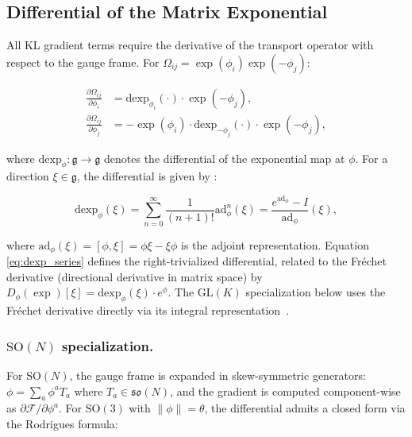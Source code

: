 \documentclass[twoside,11pt]{article}
\begin{document}
\subsection{Differential of the Matrix Exponential}

All KL gradient terms require the derivative of the transport operator with respect to the gauge frame. For $\Omega_{ij} = \exp(\phi_i)\exp(-\phi_j)$:

\begin{align}
\frac{\partial \Omega_{ij}}{\partial \phi_i} &= \mathrm{dexp}_{\phi_i}(\cdot) \cdot \exp(-\phi_j), \label{eq:dOmega_dphi_i} \\
\frac{\partial \Omega_{ij}}{\partial \phi_j} &= -\exp(\phi_i) \cdot \mathrm{dexp}_{-\phi_j}(\cdot) \cdot \exp(-\phi_j), \label{eq:dOmega_dphi_j}
\end{align}

where $\mathrm{dexp}_\phi: \mathfrak{g} \to \mathfrak{g}$ denotes the differential of the exponential map at $\phi$. For a direction $\xi \in \mathfrak{g}$, the differential is given by \citep{Gallier2020,Hall2015}:

\begin{equation}
\mathrm{dexp}_\phi(\xi) = \sum_{n=0}^{\infty} \frac{1}{(n+1)!} \mathrm{ad}_\phi^n(\xi) = \frac{e^{\mathrm{ad}_\phi} - I}{\mathrm{ad}_\phi}(\xi),
\label{eq:dexp_series}
\end{equation}

where $\mathrm{ad}_\phi(\xi) = [\phi, \xi] = \phi\xi - \xi\phi$ is the adjoint representation. Equation \eqref{eq:dexp_series} defines the right-trivialized differential, related to the Fr\'{e}chet derivative (directional derivative in matrix space) by $D_\phi(\exp)[\xi] = \mathrm{dexp}_\phi(\xi) \cdot e^\phi$. The $\mathrm{GL}(K)$ specialization below uses the Fr\'{e}chet derivative directly via its integral representation~\citep[Ch.~10]{Higham2008}.

\subsubsection{$\mathrm{SO}(N)$ specialization.}

For $\mathrm{SO}(N)$, the gauge frame is expanded in skew-symmetric generators: $\phi = \sum_a \phi^a T_a$ where $T_a \in \mathfrak{so}(N)$, and the gradient is computed component-wise as $\partial \mathcal{F}/\partial \phi^a$. For $\mathrm{SO}(3)$ with $\|\phi\| = \theta$, the differential admits a closed form via the Rodrigues formula:
\end{document}
